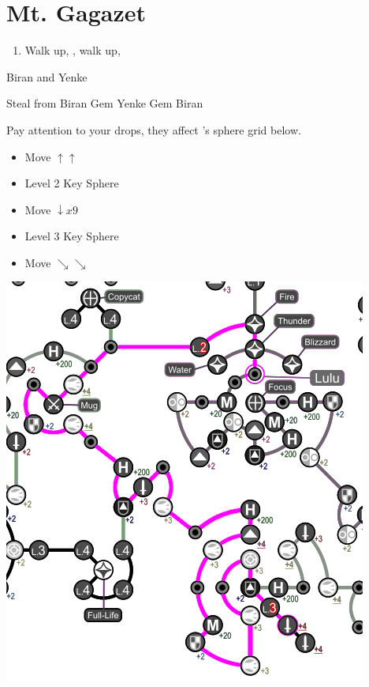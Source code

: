 \chapter{Mt. Gagazet}
\begin{enumerate}
	\item Walk up, \cs[3:40], walk up, \sd
\end{enumerate}
\begin{battle}{Biran and Yenke}
	\begin{itemize}
		\kimahrif Steal from Biran
		\kimahrif Gem Yenke
		\kimahrif Gem Biran
	\end{itemize}
	Pay attention to your drops, they affect \yuna's sphere grid below.
\end{battle}
\begin{spheregrid}
	\begin{multicols}{2}
		\begin{itemize}
			\luluf
			\begin{itemize}
				\item Move $\uparrow\uparrow$
				\item Level 2 Key Sphere
				\item Move $\downarrow x9$
				\item Level 3 Key Sphere
				\item Move $\searrow\searrow$
			\end{itemize}
			\includegraphics[width=.8\columnwidth]{graphics/lulu_grid}
			\yunaf
			\begin{itemize}

\end{itemize}
\end{itemize}
\end{multicols}
\end{spheregrid}
